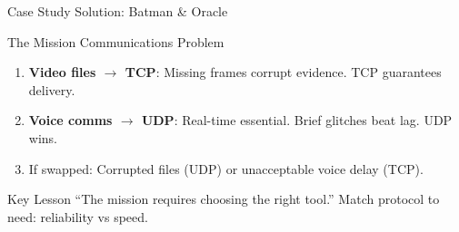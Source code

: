 \documentclass[aspectratio=169]{beamer}  %
\begin{document}
\begin{frame}{Case Study Solution: Batman \& Oracle}
    \begin{casesolution}{The Mission Communications Problem}
        \small
        \begin{enumerate}\setlength{\itemsep}{1pt}
            \item \textbf{Video files $\rightarrow$ TCP}: Missing frames corrupt evidence. TCP guarantees delivery.
            \item \textbf{Voice comms $\rightarrow$ UDP}: Real-time essential. Brief glitches beat lag. UDP wins.
            \item If swapped: Corrupted files (UDP) or unacceptable voice delay (TCP).
        \end{enumerate}
    \end{casesolution}
    
    \begin{center}
    \end{center}
    
    \begin{alertblock}{Key Lesson}
        \small
        ``The mission requires choosing the right tool.'' Match protocol to need: reliability vs speed.
    \end{alertblock}
\end{frame}
\end{document}
